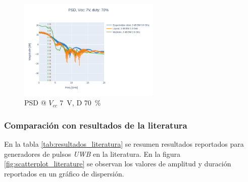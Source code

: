 \begin{figure}
  \centering
    \includegraphics[width=0.6\textwidth]{images/plots/Vcc_7V_duty_70_psd.png}
    \caption{PSD @ $V_{cc}$ \qty{7}{\volt}, D \qty{70}{\percent} }
    \label{fig:psd_7v_70}
\end{figure}

\subsubsection{Comparación con resultados de la literatura}

En la tabla \ref{tab:resultados_literatura} se resumen resultados reportados para generadores de
pulsos \textit{UWB} en la literatura. En la figura \ref{fig:scatterplot_literature} se observan
los valores de amplitud y duración reportados en un gráfico de dispersión.


